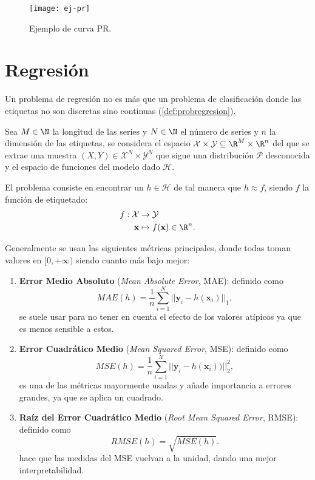 \begin{figure}[htpb]
  \centering
  \texttt{[image: ej-pr]}
  \caption{Ejemplo de curva PR.}
  \label{fig:ej-pr}
\end{figure}

\section{Regresión}

Un problema de regresión no es más que un problema de clasificación donde las etiquetas no son discretas sino continuas (\autoref{def:probregresion}).

\begin{definicion}
  Sea $M \in \N$ la longitud de las series y $N \in \N$ el número de series y $n$ la dimensión de las etiquetas, se considera el espacio $\mathcal{X} \times \mathcal{Y} \subseteq \R^M \times \R^n$ del que se extrae una muestra $(X, Y) \in \mathcal{X}^N \times \mathcal{Y}^N$ que sigue una distribución $\mathcal{P}$ desconocida y el espacio de funciones del modelo dado $\mathcal{H}$.

  El problema consiste en encontrar un $h \in \mathcal{H}$ de tal manera que $h \approx f$, siendo $f$ la función de etiquetado:
  \begin{align*}
    f : \mathcal{X} & \to \mathcal{Y} \\
    \textbf{x} & \mapsto f(\textbf{x}) \in \R^n.
  \end{align*}
  \label{def:probregresion}
\end{definicion}

Generalmente se usan las siguientes métricas principales, donde todas toman valores en $[0, +\infty)$ siendo cuanto más bajo mejor:

\begin{enumerate}
  \item \textbf{Error Medio Absoluto} (\emph{Mean Absolute Error}, MAE): definido como
  \begin{equation*}
    MAE(h) = \dfrac{1}{n} \sum \limits^N_{i = 1} || \textbf{y}_i - h(\textbf{x}_i) ||_1,
    \label{eq:mae}
  \end{equation*}
  se suele usar para no tener en cuenta el efecto de los valores atípicos ya que es menos sensible a estos.
  \item \textbf{Error Cuadrático Medio} (\emph{Mean Squared Error}, MSE): definido como
  \begin{equation}
    MSE(h) = \dfrac{1}{n} \sum \limits^N_{i = 1} || \textbf{y}_i - h(\textbf{x}_i)) ||^2_2,
    \label{eq:mse}
  \end{equation}
  es una de las métricas mayormente usadas y añade importancia a errores grandes, ya que se aplica un cuadrado.
  \item \textbf{Raíz del Error Cuadrático Medio} (\emph{Root Mean Squared Error}, RMSE): definido como
  \begin{equation*}
    RMSE(h) = \sqrt{MSE(h)}.
    \label{eq:rmse}
  \end{equation*}
  hace que las medidas del MSE vuelvan a la unidad, dando una mejor interpretabilidad.
\end{enumerate}

\endinput
